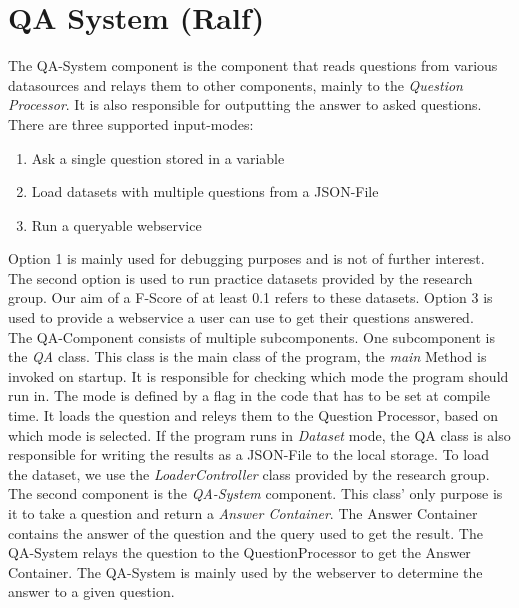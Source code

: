 \documentclass[runningheads]{llncs}
\begin{document}
\section{QA System (Ralf)}

The QA-System component is the component that reads questions from various datasources and relays them to other components, mainly to the \emph{Question Processor}. It is also responsible for outputting the answer to asked questions. \\
	
There are three supported input-modes:  

\begin{enumerate}
	\item Ask a single question stored in a variable
	\item Load datasets with multiple questions from a JSON-File 
	\item Run a queryable webservice 
\end{enumerate}

Option 1 is mainly used for debugging purposes and is not of further interest. The second option is used to run practice datasets provided by the research group. Our aim of a F-Score of at least 0.1 refers to these datasets. Option 3 is used to provide a webservice a user can use to get their questions answered. \\

The QA-Component consists of multiple subcomponents. One subcomponent is the \emph{QA} class. This class is the main class of the program, the \emph{main} Method is invoked on startup. It is responsible for checking which mode the program should run in. The mode is defined by a flag in the code that has to be set at compile time. It loads the question and releys them to the Question Processor, based on which mode is selected. If the program runs in \emph{Dataset} mode, the QA class is also responsible for writing the results as a JSON-File to the local storage. To load the dataset, we use the \emph{LoaderController} class provided by the research group. \\

The second component is the \emph{QA-System} component. This class' only purpose is it to take a question and return a \emph{Answer Container}. The Answer Container contains the answer of the question and the query used to get the result. The QA-System relays the question to the QuestionProcessor to get the Answer Container. The QA-System is mainly used by the webserver to determine the answer to a given question. \\
	
\end{document}
